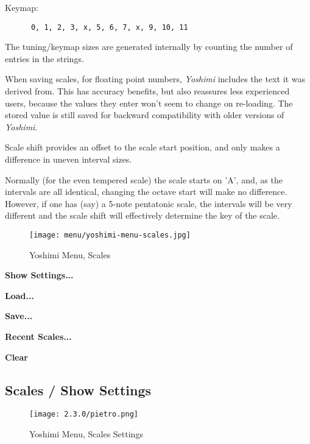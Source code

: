    Keymap:

   \begin{verbatim}
      0, 1, 2, 3, x, 5, 6, 7, x, 9, 10, 11
   \end{verbatim}

   The tuning/keymap sizes are generated internally by counting the number of
   entries in the strings.

   When saving scales, for floating point numbers, \textsl{Yoshimi} includes
   the text it was derived from. This has accuracy benefits,
   but also reassures less experienced users,
   because the values they enter won't seem to change on
   re-loading.  The stored value is still saved for backward compatibility with
   older versions of \textsl{Yoshimi}.

   Scale shift provides an offset to the scale start position, and only makes a
   difference in uneven interval sizes.

   Normally (for the even tempered scale) the scale starts on 'A', and, as the
   intervals are all identical, changing the octave start will make no
   difference. However, if one has (say) a 5-note pentatonic scale, the
   intervals will be very different and the scale shift will effectively
   determine the key of the scale.

\begin{figure}[H]
   \centering
   \texttt{[image: menu/yoshimi-menu-scales.jpg]}
   \caption{Yoshimi Menu, Scales}
   \label{fig:yoshimi_scales}
\end{figure}

   \begin{enumber}
      \item \textbf{Show Settings...}
      \item \textbf{Load...}
      \item \textbf{Save...}
      \item \textbf{Recent Scales...}
      \item \textbf{Clear}
   \end{enumber}

\subsection{Scales / Show Settings}
\label{subsec:scales_show}

\begin{figure}[H]
   \centering
   \texttt{[image: 2.3.0/pietro.png]}
   \caption{Yoshimi Menu, Scales Settings}
   \label{fig:yoshimi_scales_settings}
\end{figure}

